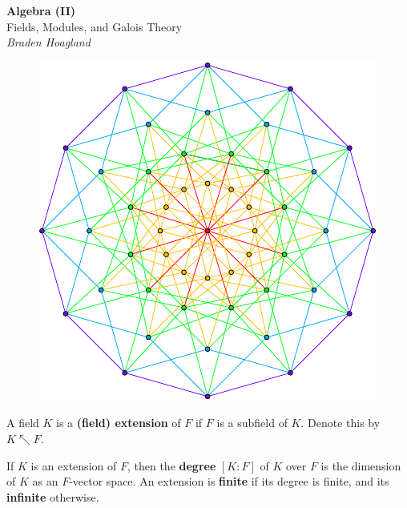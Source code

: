 \documentclass[10pt]{report}
\begin{document}
\begin{titlepage}
        \begin{center}
		{\Huge\textbf{Algebra (II)}}\\
                \vspace{4mm}
                Fields, Modules, and Galois Theory\\
                \vspace{6mm}
                \textit{Braden Hoagland}
        \end{center}
        \begin{figure}[H]
                \centering
                \includegraphics[scale=1]{fig/hey.pdf}
        \end{figure}

\end{titlepage}

\tableofcontents

\begin{defn}[]
	A field $K$ is a \textbf{(field) extension} of $F$ if $F$ is a subfield of $K$. Denote this by $K\nwarrow F$.
\end{defn}

\begin{defn}
	If $K$ is an extension of $F$, then the \textbf{degree} $[K:F]$ of $K$ over $F$ is the dimension of $K$ as an $F$-vector space. An extension is \textbf{finite} if its degree is finite, and its \textbf{infinite} otherwise.
\end{defn}
\end{document}
